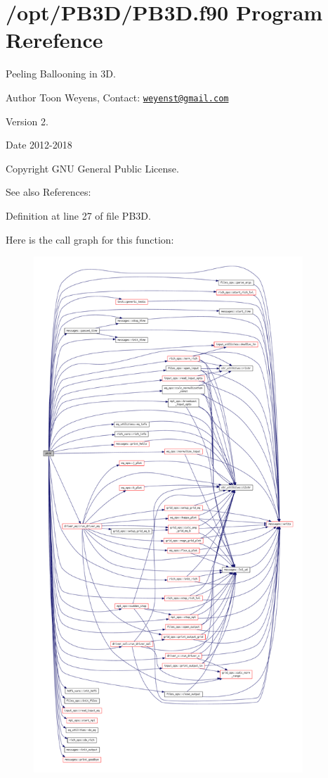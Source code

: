 \hypertarget{PB3D_8f90}{}\section{/opt/\+P\+B3\+D/\+P\+B3D.f90 Program Rerefence}
\label{PB3D_8f90}



Peeling Ballooning in 3D. 

\begin{DoxyAuthor}{Author}
Toon Weyens, Contact\+: \href{mailto:weyenst@gmail.com}{\tt weyenst@gmail.\+com} 
\end{DoxyAuthor}
\begin{DoxyVersion}{Version}
2. 
\end{DoxyVersion}
\begin{DoxyDate}{Date}
2012-\/2018 
\end{DoxyDate}
\begin{DoxyCopyright}{Copyright}
G\+NU General Public License. 
\end{DoxyCopyright}
\begin{DoxySeeAlso}{See also}
References\+: \cite{weyens2014theory} \cite{Weyens2017PB3D} 
\end{DoxySeeAlso}


Definition at line 27 of file P\+B3\+D.

Here is the call graph for this function\+:
\nopagebreak
\begin{figure}[H]
\begin{center}
\leavevmode
\includegraphics[height=550pt]{PB3D_8f90_afaee01f014ab3398eecac996b2795fd2_cgraph}
\end{center}
\end{figure}
